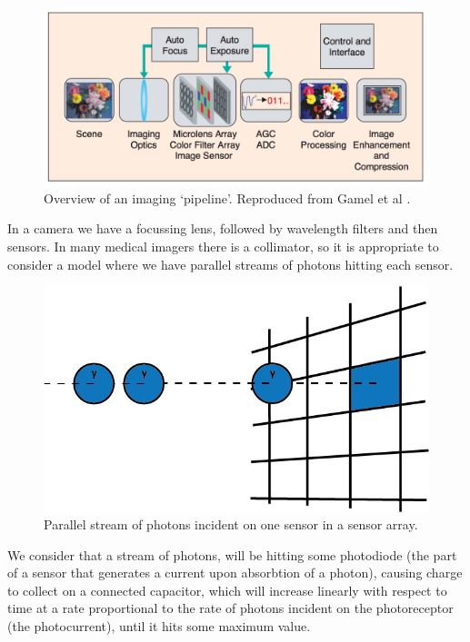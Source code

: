 \documentclass[12pt,twoside,notitlepage]{report}
\begin{document}
            \begin{figure}[H]
                \centering
                \includegraphics[scale=0.30]{imaging_pipeline}
                \caption{Overview of an imaging `pipeline'. Reproduced from Gamel et al \cite{gamal2005cmos}.}
                \label{fig:image_pipeline}
            \end{figure}

            In a camera we have a focussing lens, followed by wavelength filters and then sensors. In many medical imagers 
            there is a collimator, so it is appropriate to consider a model where we have parallel streams of photons 
            hitting each sensor.

            \begin{figure}[H]
                \centering
                \includegraphics[scale=0.5]{photon_stream}
                \caption{Parallel stream of photons incident on one sensor in a sensor array.}
                \label{fig:photon_stream}
            \end{figure}

            We consider that a stream of photons, will be hitting some photodiode (the 
            part of a sensor that generates a current upon absorbtion of a photon), causing charge to collect on a connected 
            capacitor, which will increase linearly with respect to time at a rate proportional to the rate of photons 
            incident on the photoreceptor (the photocurrent), until it hits some maximum value. \cite{gamal2005cmos}
\end{document}
